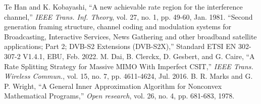 \documentclass[draftclsnofoot, onecolumn, comsoc, 12pt]{IEEEtran}
\begin{document}
\begin{thebibliography}{1}
 \label{ref:Han Kobayashi}
Te Han and K. Kobayashi, ``A new achievable rate region for the interference channel,'' \emph{IEEE Trans. Inf. Theory}, vol. 27, no. 1, pp. 49-60, Jan. 1981.
 \label{ref:DVB-S2X}
``Second generation framing structure, channel coding and modulation systems for Broadcasting, Interactive Services, News Gathering and other broadband satellite applications; Part 2; DVB-S2 Extensions (DVB-S2X),'' Standard ETSI EN 302-307-2 V1.4.1, EBU, Feb. 2022.
 \label{ref:HRS}
M. Dai, B. Clerckx, D. Gesbert, and G. Caire, ``A Rate Splitting Strategy for Massive MIMO With Imperfect CSIT,'' \emph{IEEE Trans. Wireless Commun.}, vol. 15, no. 7, pp. 4611-4624, Jul. 2016.
 \label{ref:Math_Convex}
B. R. Marks and G. P. Wright, ``A General Inner Approximation Algorithm for Nonconvex Mathematical Programs,'' \emph{Open research}, vol. 26, no. 4, pp. 681-683, 1978.
\end{thebibliography}




\end{document}
